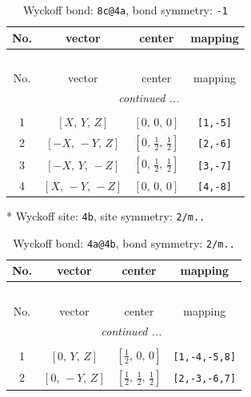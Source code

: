 \documentclass[fleqn,8pt]{jsarticle}
\begin{document}
\renewcommand{\arraystretch}{1.2}
\begin{longtable}{cccc}
\caption{Wyckoff bond: {\tt 8c@4a}, bond symmetry: {\tt -1}}
 \\
 \hline \hline
No. & vector & center & mapping \\ \hline \endfirsthead

\multicolumn{3}{l}{\tablename\ \thetable{}} \\
 \hline \hline
No. & vector & center & mapping \\ \hline \endhead

 \hline \hline
\multicolumn{3}{r}{\footnotesize\it continued ...} \\ \endfoot

 \hline \hline
\multicolumn{3}{r}{} \\ \endlastfoot

1 & $\left[ X,\, Y,\, Z \right]$ & $\left[ 0,\, 0,\, 0 \right]$ & {\tt [1,-5]} \\ \hline
2 & $\left[ - X,\, - Y,\, Z \right]$ & $\left[ 0,\, \frac{1}{2},\, \frac{1}{2} \right]$ & {\tt [2,-6]} \\ \hline
3 & $\left[ - X,\, Y,\, - Z \right]$ & $\left[ 0,\, \frac{1}{2},\, \frac{1}{2} \right]$ & {\tt [3,-7]} \\ \hline
4 & $\left[ X,\, - Y,\, - Z \right]$ & $\left[ 0,\, 0,\, 0 \right]$ & {\tt [4,-8]} \\
\end{longtable}
* Wyckoff site: {\tt 4b}, site symmetry: {\tt 2/m..}
\renewcommand{\arraystretch}{1.2}
\begin{longtable}{cccc}
\caption{Wyckoff bond: {\tt 4a@4b}, bond symmetry: {\tt 2/m..}}
 \\
 \hline \hline
No. & vector & center & mapping \\ \hline \endfirsthead

\multicolumn{3}{l}{\tablename\ \thetable{}} \\
 \hline \hline
No. & vector & center & mapping \\ \hline \endhead

 \hline \hline
\multicolumn{3}{r}{\footnotesize\it continued ...} \\ \endfoot

 \hline \hline
\multicolumn{3}{r}{} \\ \endlastfoot

1 & $\left[ 0,\, Y,\, Z \right]$ & $\left[ \frac{1}{2},\, 0,\, 0 \right]$ & {\tt [1,-4,-5,8]} \\ \hline
2 & $\left[ 0,\, - Y,\, Z \right]$ & $\left[ \frac{1}{2},\, \frac{1}{2},\, \frac{1}{2} \right]$ & {\tt [2,-3,-6,7]} \\
\end{longtable}
\end{document}

